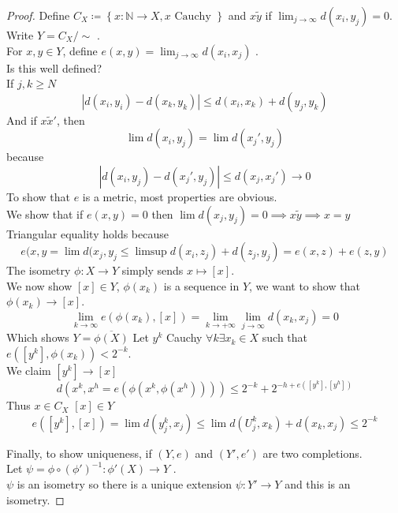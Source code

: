 \documentclass[../main.tex]{subfiles}
\begin{document}
\begin{proof}
Define $C_X \coloneqq \left\{ x: \mathbb{N}\to X, x \text{ Cauchy }  \right\} $ and $x\tilde y$ if $\lim_{j \to \infty } d( x_i,y_j) =0$.\\
Write $Y = C_X /\sim$ .\\
For $x,y \in Y$, define $ e( x,y) = \lim_{j \to \infty } d( x_i,x_j) $ .\\
Is this well defined?\\
If $j,k \geq N$ 
\[ 
|d( x_i,y_i) - d( x_k,y_k) | \leq d( x_i,x_k) + d( y_j,y_k) 
\]
And if $x\tilde x'$, then
\[ 
\lim d( x_i,y_j ) = \lim d( x_j', y_j) 
\]
because
\[ 
|d( x_i,y_j) - d( x_j', y_j ) | \leq  d( x_j, x_j') \to 0
\]
To show that $e$ is a metric, most properties are obvious.\\
We show that if $e( x,y) =0 $ then $\lim d( x_j, y_j) =0 \implies x\tilde y \implies x=y$ \\
Triangular equality holds because
\[ 
e( x,y	= \lim d( x_j, y_j	\leq  \limsup d( x_i,z_j) + d( z_j,y_j)  = e( x,z) + e( z,y) 	
\]
The isometry $\phi:X\to Y$ simply sends $x\mapsto [ x] $.\\
We now show $ [ x] \in Y$, $\phi( x_k) $ is a sequence in $Y$, we want to show that $\phi( x_k) \to [ x] $.\\
\[ 
\lim_{k \to \infty } e( \phi( x_k) , [ x] ) = \lim_{k \to  + \infty} \lim_{j \to \infty } d( x_k, x_j ) =0
\]
Which shows $Y= \overline{\phi( X) }$ 
Let $y^{k}$ Cauchy $\forall k \exists x_k \in X$ such that  $e( [ y^{k}] ,\phi( x_k)  ) < 2^{-k}$.\\
We claim $[y^{k}] \to [ x] $ 
\[ 
d( x^{k},x^{h}= e( \phi( x^{k },\phi( x^{h}) ) ) )  \leq  2^{-k}+ 2^{-h + e( [ y^{k}], [ y^{h}]  ) }
\]
Thus $x\in C_X$ 
$[x]\in Y$ 
\[ 
	e( [ y^{k}] ,[x] ) = \lim d( y_j^{k},x_j) \leq  \lim d( U_j^{k},x_k ) + d( x_k,x_j) \leq  2^{-k}
\]


Finally, to show uniqueness, if $( Y,e) $ and $( Y', e') $ are two completions.\\
Let $\psi= \phi\circ( \phi')^{-1}: \phi'( X) \to Y$ .\\
$\psi$ is an isometry so there is a unique extension $\psi:Y' \to Y$ and this is an isometry.
\end{proof}
\end{document}
